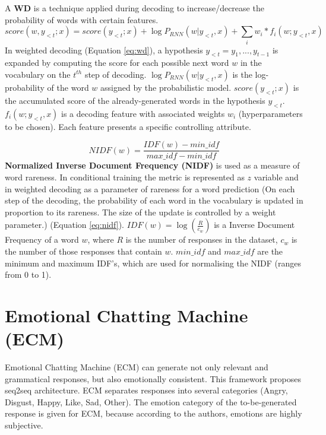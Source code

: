 A \textbf{WD} is a technique applied during decoding to increase/decrease the probability of words with certain features. 
\begin{equation} \label{eq:wd}
score(w, y_{<t}; x) = score(y_{<t}; x) + \log P_{RNN}(w|y_{<t}, x) + \sum_i w_i * f_i(w; y_{<t}, x)
\end{equation}
In weighted decoding (Equation \ref{eq:wd}), a hypothesis $y_{<t} = y_1, ..., y_{t-1}$ is expanded by computing the score for each possible next word $w$ in the vocabulary on the $t^{th}$ step of decoding. $\log P_{RNN}(w|y_{<t}, x)$ is the log-probability of the word $w$ assigned by the probabilistic model. $score(y_{<t}; x)$ is the accumulated score of the already-generated words in the hypothesis $y_{<t}$. $f_i(w; y_{<t}, x)$ is a decoding feature with associated weights $w_i$ (hyperparameters to be chosen). Each feature presents a specific controlling attribute.

\begin{equation} \label{eq:nidf}
NIDF(w) = \frac{IDF(w) - min\_idf}{max\_idf - min\_idf}
\end{equation}
\textbf{Normalized Inverse Document Frequency (NIDF)} is used as a measure of word rareness. In conditional training the metric is represented as $z$ variable and in weighted decoding as a parameter of rareness for a word prediction (On each step of the decoding, the probability of each word in the vocabulary is updated in proportion to its rareness. The size of the update is controlled by a weight parameter.) (Equation \ref{eq:nidf}). $IDF(w) = \log(\frac{R}{c_w})$ is a Inverse Document Frequency of a word $w$, where $R$ is the number of responses in the dataset, $c_w$ is the number of those responses that contain $w$. $min\_idf$ and $max\_idf$ are the minimum and maximum IDF's, which are used for normalising the NIDF (ranges from 0 to 1).

\section{Emotional Chatting Machine (ECM)}
Emotional Chatting Machine (ECM) \cite{zhou2018emotional} can generate not only relevant and grammatical responses, but also emotionally consistent. This framework proposes seq2seq architecture. ECM separates responses into several categories (Angry, Disgust, Happy, Like, Sad, Other). The emotion category of the to-be-generated response is given for ECM, because according to the authors, emotions are highly subjective. 

